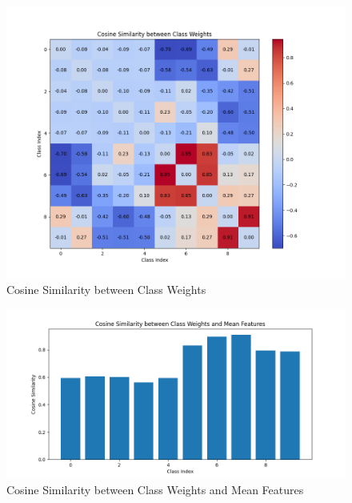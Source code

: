 \documentclass{article}
\begin{document}
\begin{multicols}{2}
\columnbreak
\begin{figure}[H]
\centering
\includegraphics[width=\linewidth]{Plot/VS/2023_11_30/cos_VS_5000_50_epoch_199.png}
\caption{Cosine Similarity between Class Weights}
\end{figure}
\begin{figure}[H]
\centering
\includegraphics[width=\linewidth]{Plot/VS/2023_11_30/Wi_Hi_cos_VS_5000_50_epoch_199.png}
\caption{Cosine Similarity between Class Weights and Mean Features}
\end{figure}

\end{multicols} %
\end{document}

